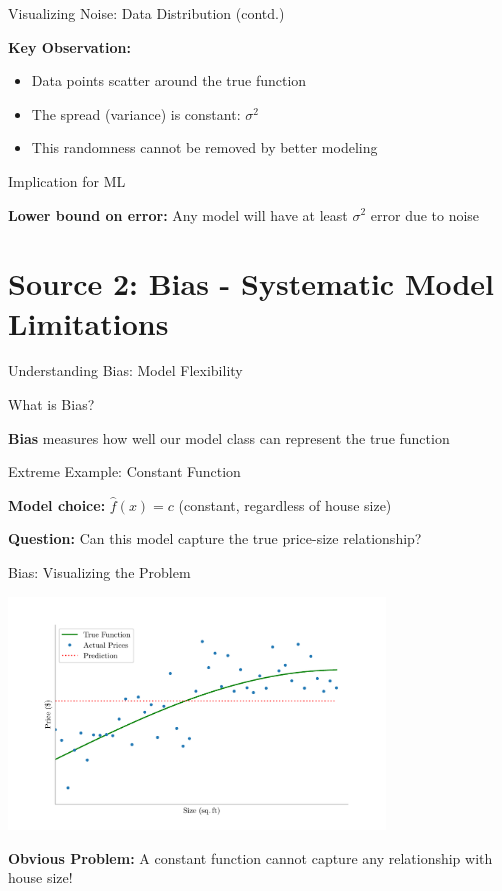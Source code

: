 \documentclass[10pt]{beamer}
\newcommand{\fitpic}[1]{\begin{adjustbox}{max width=\linewidth, max totalheight=0.78\textheight}#1\end{adjustbox}}
\begin{document}
\begin{frame}{Visualizing Noise: Data Distribution (contd.)}
\footnotesize
\begin{keypointsbox}
\raggedright
\textbf{Key Observation:} 
\begin{itemize}
\item Data points scatter around the true function
\item The spread (variance) is constant: $\sigma^2$
\item This randomness cannot be removed by better modeling
\end{itemize}
\end{keypointsbox}

\begin{alertbox}{Implication for ML}
\raggedright
\textbf{Lower bound on error:} Any model will have at least $\sigma^2$ error due to noise
\end{alertbox}
\end{frame}

\section{Source 2: Bias - Systematic Model Limitations}

\begin{frame}{Understanding Bias: Model Flexibility}
\small
\begin{definitionbox}{What is Bias?}
\raggedright
\textbf{Bias} measures how well our model class can represent the true function
\end{definitionbox}

\begin{examplebox}{Extreme Example: Constant Function}
\raggedright
\textbf{Model choice:} $\hat{f}(x) = c$ (constant, regardless of house size)

\textbf{Question:} Can this model capture the true price-size relationship?
\end{examplebox}
\end{frame}

\begin{frame}{Bias: Visualizing the Problem}
\begin{center}
\fitpic{\includegraphics[width=0.75\textwidth]{../assets/bias-variance/figures/biasn_2_latexify.pdf}}
\end{center}

\begin{alertbox}
\raggedright
\textbf{Obvious Problem:} A constant function cannot capture any relationship with house size!
\end{alertbox}
\end{frame}
\end{document}
